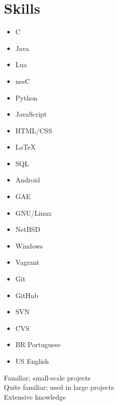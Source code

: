 \documentclass[a4paper,10pt]{article}
\begin{document}
\section{Skills}

\begin{multicols}{3}
  \begin{itemize}
    \renewcommand{\labelitemi}{\textcolor{lightg}{\symbol{"00BB}}}
    \setlength{\itemsep}{1pt}
    \setlength{\parskip}{0pt}
    \setlength{\parsep}{0pt}
  \item C \hfill \threenotes 
  \item Java \hfill \threenotes
  \item Lua \hfill \threenotes
  \item nesC \hfill \onenote
  \item Python \hfill \twonotes
  \item JavaScript \hfill \twonotes
  \item HTML/CSS \hfill \twonotes
  \item \LaTeX \hfill \twonotes
  \item SQL \hfill \twonotes
  \item Android \hfill \twonotes
  \item GAE \hfill \twonotes
  \item GNU/Linux \hfill \threenotes
  \item NetBSD \hfill \twonotes
  \item Windows \hfill \onenote
  \item Vagrant \hfill \twonotes
  \item Git \hfill \twonotes
  \item GitHub \hfill \twonotes
  \item SVN \hfill \onenote
  \item CVS \hfill \onenote
  \item BR Portuguese \hfill \twonotes
  \item US English \hfill \twonotes
  \end{itemize} 
\end{multicols}

\vspace{1em}

\begin{center}
\parbox[c]{8cm}{
  \onenote Familiar; small-scale projects \\
  \twonotes Quite familiar; used in large projects \\
  \threenotes Extensive knowledge
}
\end{center}
\end{document}
